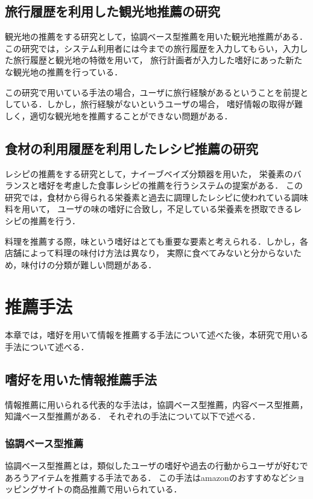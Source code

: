 \documentclass{funthesis}
\begin{document}
\section{旅行履歴を利用した観光地推薦の研究}
観光地の推薦をする研究として，協調ベース型推薦を用いた観光地推薦がある\cite{7}．
この研究では，システム利用者には今までの旅行履歴を入力してもらい，入力した旅行履歴と観光地の特徴を用いて，
旅行計画者が入力した嗜好にあった新たな観光地の推薦を行っている．

この研究で用いている手法の場合，ユーザに旅行経験があるということを前提としている．しかし，旅行経験がないというユーザの場合，
嗜好情報の取得が難しく，適切な観光地を推薦することができない問題がある．

\section{食材の利用履歴を利用したレシピ推薦の研究}
レシピの推薦をする研究として，ナイーブベイズ分類器を用いた，
栄養素のバランスと嗜好を考慮した食事レシピの推薦を行うシステムの提案がある\cite{8}．
この研究では，食材から得られる栄養素と過去に調理したレシピに使われている調味料を用いて，
ユーザの味の嗜好に合致し，不足している栄養素を摂取できるレシピの推薦を行う．

料理を推薦する際，味という嗜好はとても重要な要素と考えられる．しかし，各店舗によって料理の味付け方法は異なり，
実際に食べてみないと分からないため，味付けの分類が難しい問題がある．


\chapter{推薦手法}
本章では，嗜好を用いて情報を推薦する手法について述べた後，本研究で用いる手法について述べる．

\section{嗜好を用いた情報推薦手法}
情報推薦に用いられる代表的な手法は，協調ベース型推薦，内容ベース型推薦，知識ベース型推薦がある\cite{4}．
それぞれの手法について以下で述べる．

\subsection{協調ベース型推薦}
協調ベース型推薦とは，類似したユーザの嗜好や過去の行動からユーザが好むであろうアイテムを推薦する手法である．
この手法はamazon\cite{5}のおすすめなどショッピングサイトの商品推薦で用いられている．
\end{document}

